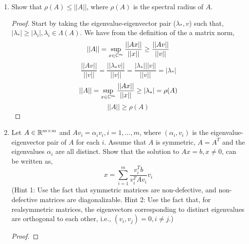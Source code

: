 \documentclass{article}
\begin{document}
\begin{enumerate}
\begin{enumerate}
\begin{proof}
        \end{proof}

        \item
        Show that I − A is nonsingular
        \begin{proof}
            
        \end{proof}

     \end{enumerate}
    
     \item 
      Show that $\rho(A) \le ||A||$, where $\rho(A)$ is the spectral radius of $A$.
    
    \begin{proof}

    Start by taking the eigenvalue-eigenvector pair ($\lambda_*, v$) such that, $|\lambda_*| \ge |\lambda_i|, \lambda_i \in \Lambda(A)$. We have from the definition of the a matrix norm, 
    \[
        ||A|| = \sup_{x \in \mathbb{C}^m} \frac{||Ax||}{||x||} \ge \frac{||Av||}{||v||}
    \]
    \[
        \frac{||Av||}{||v||} = \frac{||\lambda_* v||}{||v||} = \frac{|\lambda_*| ||v||}{||v||} = |\lambda_*|
    \]
    \[
        ||A|| = \sup_{x \in \mathbb{C}^m} \frac{||Ax||}{||x||} \ge |\lambda_*| = \rho(A)
    \]
    \[
        ||A|| \ge \rho(A)   
    \]
    \end{proof}

    \item 
    Let $A \in \mathbb{R}^{m\times m}$ and $Av_i = \alpha_i v_i, i = 1, . . . , m$, where $(\alpha_i , v_i)$ is the eigenvalue-eigenvector pair of $A$ for each $i$. Assume that $A$ is symmetric, $A = A^T$ and the eigenvalues $\alpha_i$ are all distinct. Show that the solution to $Ax = b, x \neq 0$, can be written as, 
\[
    x = \sum_{i=1}^m\frac{v_i^Tb}{v_i^TAv_i}v_i
\]
(Hint 1: Use the fact that symmetric matrices are non-defective, and non-defective matrices are diagonalizable. Hint 2: Use the fact that, for realsymmetric matrices, the eigenvectors corresponding to distinct eigenvalues are orthogonal to each other, i.e., $(v_i , v_j) = 0, i \neq j.$)
   
    \begin{proof}
    

\end{proof}
\end{enumerate}
\end{document}

